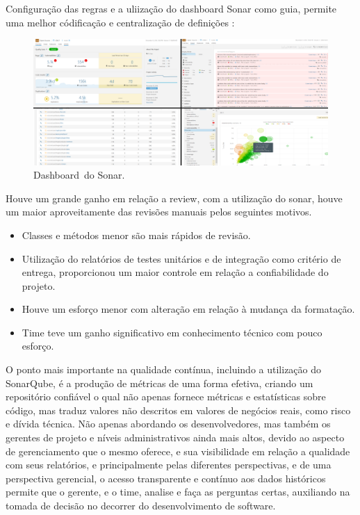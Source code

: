 \documentclass[12pt]{article}
\begin{document}
Configuração das regras e a uliização do dashboard Sonar como guia, permite uma melhor códificação e centralização de definições :

\begin{figure}[h]
	\centering
		\includegraphics[scale=0.25]{img/sonar-dashboard.png}
	\caption{Dashboard\ do Sonar.}
	\label{fig:sonar-dashboard}
\end{figure}

Houve um grande ganho em relação a review, com a utilização do sonar, houve um maior aproveitamente das revisões manuais pelos seguintes motivos.
 \begin{itemize}
	\item Classes e métodos menor são mais rápidos de revisão.
  \item Utilização do relatórios de testes unitários e de integração como critério de entrega, proporcionou um maior controle em relação a confiabilidade do projeto.
	\item Houve um esforço menor com alteração em relação à mudança da formatação.
	\item Time teve um ganho significativo em conhecimento técnico com pouco esforço.
\end{itemize}

O ponto mais importante na qualidade contínua, incluindo a utilização do SonarQube, é a produção de métricas de uma forma efetiva, criando um repositório confiável o qual não apenas fornece métricas e estatísticas sobre código, mas traduz valores não descritos em valores de negócios reais, como risco e dívida técnica.
Não apenas abordando os desenvolvedores, mas também os gerentes de projeto e níveis administrativos ainda mais altos, devido ao aspecto de gerenciamento que o mesmo oferece, e sua visibilidade em relação a qualidade com seus relatórios, e principalmente pelas diferentes perspectivas, e de uma perspectiva gerencial, o acesso transparente e contínuo aos dados históricos permite que o gerente, e o time, analise e faça as perguntas certas,  auxiliando na tomada de decisão no decorrer do desenvolvimento de software.

\newpage
%


\end{document}
